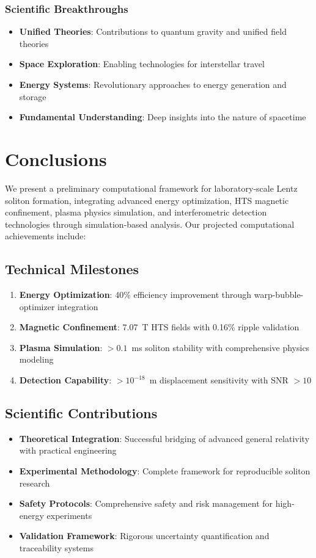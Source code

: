 \documentclass[12pt,a4paper]{article}
\begin{document}
\subsubsection{Scientific Breakthroughs}
\begin{itemize}
\item \textbf{Unified Theories}: Contributions to quantum gravity and unified field theories
\item \textbf{Space Exploration}: Enabling technologies for interstellar travel
\item \textbf{Energy Systems}: Revolutionary approaches to energy generation and storage
\item \textbf{Fundamental Understanding}: Deep insights into the nature of spacetime
\end{itemize}

\section{Conclusions}

We present a preliminary computational framework for laboratory-scale Lentz soliton formation, integrating advanced energy optimization, HTS magnetic confinement, plasma physics simulation, and interferometric detection technologies through simulation-based analysis. Our projected computational achievements include:

\subsection{Technical Milestones}
\begin{enumerate}
\item \textbf{Energy Optimization}: 40\% efficiency improvement through warp-bubble-optimizer integration
\item \textbf{Magnetic Confinement}: 7.07~T HTS fields with 0.16\% ripple validation
\item \textbf{Plasma Simulation}: $>0.1$~ms soliton stability with comprehensive physics modeling
\item \textbf{Detection Capability}: $>10^{-18}$~m displacement sensitivity with SNR $>10$
\end{enumerate}

\subsection{Scientific Contributions}
\begin{itemize}
\item \textbf{Theoretical Integration}: Successful bridging of advanced general relativity with practical engineering
\item \textbf{Experimental Methodology}: Complete framework for reproducible soliton research
\item \textbf{Safety Protocols}: Comprehensive safety and risk management for high-energy experiments
\item \textbf{Validation Framework}: Rigorous uncertainty quantification and traceability systems
\end{itemize}
\end{document}
